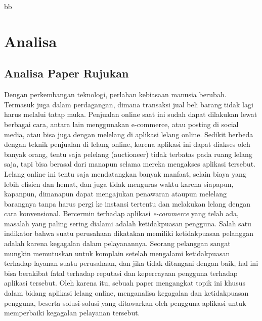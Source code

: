 bb\section{Analisa}
  
    \subsection{Analisa Paper Rujukan}
    Dengan perkembangan teknologi, perlahan kebiasaan manusia berubah. Termasuk juga dalam perdagangan, dimana transaksi jual beli barang tidak lagi harus melalui tatap muka. Penjualan online saat ini sudah dapat dilakukan lewat berbagai cara, antara lain menggunakan e-commerce, atau posting di social media, atau bisa juga dengan melelang di aplikasi lelang online. Sedikit berbeda dengan teknik penjualan di lelang online, karena aplikasi ini dapat diakses oleh banyak orang, tentu saja pelelang (auctioneer) tidak terbatas pada ruang lelang saja, tapi bisa berasal dari manapun selama mereka mengakses aplikasi tersebut.  Lelang online ini tentu saja mendatangkan banyak manfaat, selain biaya yang lebih efisien dan hemat, dan juga tidak menguras waktu karena siapapun, kapanpun, dimanapun dapat mengajukan penawaran ataupun melelang barangnya tanpa harus pergi ke instansi tertentu dan melakukan lelang dengan cara konvensional.
    Bercermin terhadap aplikasi \textit{e-commerce} yang telah ada, masalah yang paling sering dialami adalah ketidakpuasan pengguna. Salah satu indikator bahwa suatu perusahaan dikatakan memiliki ketidakpuasan pelanggan adalah karena kegagalan dalam pelayanannya. Seorang pelanggan sangat mungkin memutuskan untuk komplain setelah mengalami ketidakpuasan terhadap layanan suatu perusahaan, dan jika tidak ditangani dengan baik, hal ini bisa berakibat fatal terhadap reputasi dan kepercayaan pengguna terhadap aplikasi tersebut.
    Oleh karena itu, sebuah paper mengangkat topik ini khusus dalam bidang aplikasi lelang online, menganalisa kegagalan dan ketidakpuasan pengguna, beserta solusi-solusi yang ditawarkan oleh pengguna aplikasi untuk memperbaiki kegagalan pelayanan tersebut. 
